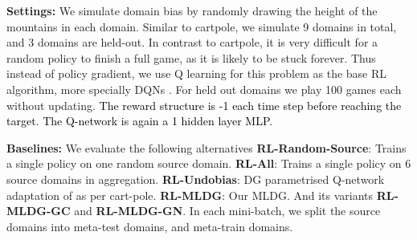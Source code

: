 \documentclass[letterpaper]{article} \usepackage{aaai18}  \usepackage{times}  \usepackage{helvet}  \usepackage{courier}  \usepackage{url}  \usepackage{graphicx}  \usepackage{amsmath}
\newcommand{\keypoint}[1]{\vspace{0.1cm}\noindent\textbf{#1}\quad}
\begin{document}
{\keypoint{Settings:} We simulate domain bias by randomly drawing the height of the mountains in each domain. Similar to cartpole, we simulate 9 domains in total, and 3 domains are held-out. 
In contrast to cartpole, it is very difficult for a random policy to finish a full game, as it is likely to be stuck forever. Thus instead of policy gradient, we use Q learning \cite{qlearningwatkins1992} for this problem as the base RL algorithm, more specially DQNs \cite{mnih2015dqn}. For held out domains we play 100 games each {without updating}. \textcolor{black}{The reward structure is -1 each time step before reaching the target.} \textcolor{black}{The Q-network is again a 1 hidden layer MLP.} 

\keypoint{Baselines:} We evaluate the following alternatives \quad \textbf{RL-Random-Source}: Trains a single policy on one random source domain. \textbf{RL-All}: Trains a single policy on 6 source domains in aggregation. \textbf{RL-Undobias}: DG parametrised Q-network adaptation of \cite{khosla2012undoing,da2017dg} as per cart-pole. \textbf{RL-MLDG}: Our  MLDG. And its variants \textbf{RL-MLDG-GC} and \textbf{RL-MLDG-GN}. In each mini-batch, we split the  source domains into  meta-test domains, and  meta-train domains.

\begin{table}[t]
\centering
\caption{Domain generalisation performance for mountain car. Failure rate () and reward () on held out testing domains with random mountain heights.}
\label{rl2}
\end{table}


}
\end{document}
